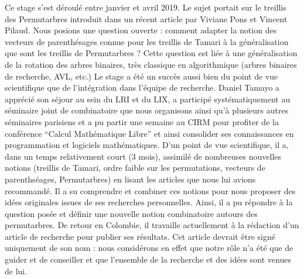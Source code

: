 \documentclass[11pt,a4paper]{letter} %
\begin{document}
\begin{letter}
Ce stage s'est déroulé entre janvier et avril 2019. Le sujet portait sur le treillis des Permutarbres introduit dans un récent article par Viviane Pons et Vincent Pilaud. Nous posions une question ouverte : comment adapter la notion des vecteurs de parenthésages connue pour les treillis de Tamari à la généralisation que sont les treillis de Permutarbres ? Cette question est liée à une généralisation de la rotation des arbres binaires, très classique en algorithmique (arbres binaires de recherche, AVL, etc.) Le stage a été un succès aussi bien du point de vue scientifique que de l'intégration dans l'équipe de recherche. Daniel Tamayo a apprécié son séjour au sein du LRI et du LIX, a participé systématiquement au séminaire joint de combinatoire que nous organisons ainsi qu'à plusieurs autres séminaires parisiens et a pu partir une semaine au CIRM pour profiter de la conférence ``Calcul Mathématique Libre'' et ainsi consolider ses connaissances en programmation et logiciels mathématiques. D'un point de vue scientifique, il a, dans un temps relativement court (3 mois), assimilé de nombreuses nouvelles notions (treillis de Tamari, ordre faible sur les permutations, vecteurs de parenthséages, Permutarbres) en lisant les articles que nous lui avions recommandé. Il a su comprendre et combiner ces notions pour nous proposer des idées originales issues de ses recherches personnelles. Ainsi, il a pu répondre à la question posée et définir une nouvelle notion combinatoire autours des permutarbres. De retour en Colombie, il travaille actuellement à la rédaction d'un article de recherche pour publier ses résultats. Cet article devrait être signé uniquement de son nom : nous considérons en effet que notre rôle n'a été que de guider et de conseiller et que l'ensemble de la recherche et des idées sont venues de lui.


\end{letter}
\end{document}
